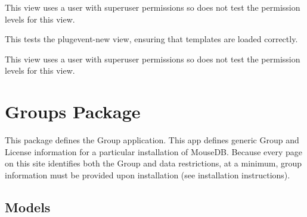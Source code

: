 \documentclass[letterpaper,10pt,english]{sphinxmanual}
\begin{document}
\begin{fulllineitems}
\begin{fulllineitems}
This view uses a user with superuser permissions so does not test the permission levels for this view.

\end{fulllineitems}



\begin{fulllineitems}
\label{api:mousedb.timed_mating.tests.Timed_MatingViewTests.test_plugevent_new}
This tests the plugevent-new view, ensuring that templates are loaded correctly.

This view uses a user with superuser permissions so does not test the permission levels for this view.

\end{fulllineitems}


\end{fulllineitems}



\section{Groups Package}
\label{api:groups-package}\label{api:module-mousedb.groups}
This package defines the Group application.
This app defines generic Group and License information for a particular installation of MouseDB.  
Because every page on this site identifies both the Group and data restrictions, at a minimum, group information must be provided upon installation (see installation instructions).


\subsection{Models}
\label{api:id13}\label{api:module-mousedb.groups.models}
\end{document}
